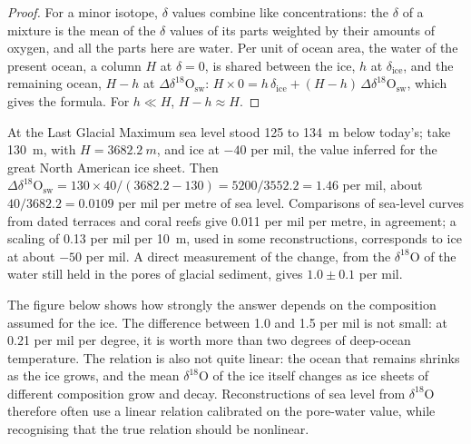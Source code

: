 \begin{proof}
For a minor isotope, $\delta$ values combine like concentrations: the $\delta$ of a mixture is
the mean of the $\delta$ values of its parts weighted by their amounts of oxygen, and all the
parts here are water. Per unit of ocean area, the water of the present ocean, a column $H$ at
$\delta = 0$, is shared between the ice, $h$ at $\delta_{\mathrm{ice}}$, and the remaining ocean,
$H - h$ at $\Delta\delta^{18}\mathrm{O}_{\mathrm{sw}}$:
$H \times 0 = h\,\delta_{\mathrm{ice}} + (H - h)\,\Delta\delta^{18}\mathrm{O}_{\mathrm{sw}}$, which
gives the formula. For $h \ll H$, $H - h \approx H$.
\end{proof}

\begin{example}\label{ex:b2:climate-proxies:lgm}
At the Last Glacial Maximum sea level stood 125 to \qty{134}{m} below today's; take \qty{130}{m},
with $H = \qty{3682.2}{m}$, and ice at $-40$ per mil, the value inferred for the great North
American ice sheet. Then
$\Delta\delta^{18}\mathrm{O}_{\mathrm{sw}} = 130 \times 40/(3682.2 - 130) = 5200/3552.2 = 1.46$
per mil, about $40/3682.2 = 0.0109$ per mil per metre of sea level. Comparisons of sea-level curves
from dated terraces and coral reefs give \num{0.011} per mil per metre, in agreement; a scaling of
\num{0.13} per mil per \qty{10}{m}, used in some reconstructions, corresponds to ice at about
$-50$ per mil. A direct measurement of the change, from the $\delta^{18}$O of the water still held
in the pores of glacial sediment, gives $1.0 \pm 0.1$ per mil.
\end{example}

The figure below shows how strongly the answer depends on the composition assumed for the ice.
The difference between \num{1.0} and \num{1.5} per mil is not small: at \num{0.21} per mil per degree,
it is worth more than two degrees of deep-ocean temperature. The relation is also not quite
linear: the ocean that remains shrinks as the ice grows, and the mean $\delta^{18}$O of the ice
itself changes as ice sheets of different composition grow and decay. Reconstructions of sea level
from $\delta^{18}$O therefore often use a linear relation calibrated on the pore-water value, while
recognising that the true relation should be nonlinear.

